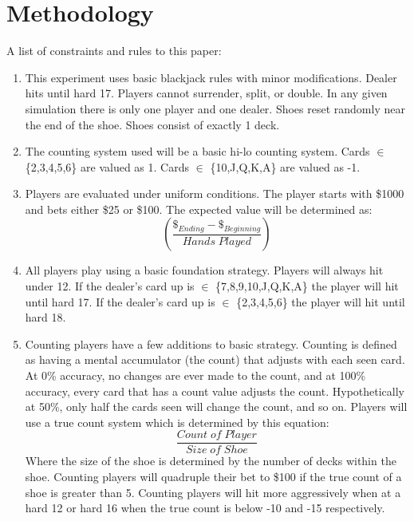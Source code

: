 \documentclass[11pt,letterpaper]{article}
\begin{document}
\part{Methodology}
A list of constraints and rules to this paper:
\begin{enumerate}
\item This experiment uses basic blackjack rules with minor modifications.
\subitem Dealer hits until hard 17.
\subitem Players cannot surrender, split, or double.
\subitem In any given simulation there is only one player and one dealer.
\subitem Shoes reset randomly near the end of the shoe.
\subitem Shoes consist of exactly 1 deck.
\item The counting system used will be a basic hi-lo counting system.
\subitem Cards $\in$ \{2,3,4,5,6\} are valued as 1.
\subitem Cards $\in$ \{10,J,Q,K,A\} are valued as -1.
\item Players are evaluated under uniform conditions.
\subitem The player starts with \$1000 and bets either \$25 or \$100.
\subitem The expected value will be determined as:
\[(\frac{\$_{Ending}-\$_{Beginning}}{Hands\;Played})\]
\item All players play using a basic foundation strategy.
\subitem Players will always hit under 12.
\subitem If the dealer's card up is $\in$ \{7,8,9,10,J,Q,K,A\} the player will hit until hard 17.
\subitem If the dealer's card up is $\in$ \{2,3,4,5,6\} the player will hit until hard 18.
\item Counting players have a few additions to basic strategy.
\subitem Counting is defined as having a mental accumulator (the count) that adjusts with each seen card. At 0\% accuracy, no changes are ever made to the count, and at 100\% accuracy, every card that has a count value adjusts the count. Hypothetically at 50\%, only half the cards seen will change the count, and so on.
\subitem Players will use a true count system which is determined by this equation:
\[\frac{Count\;of\;Player}{Size\;of\;Shoe}\]
Where the size of the shoe is determined by the number of decks within the shoe.
\subitem Counting players will quadruple their bet to \$100 if the true count of a shoe is greater than 5.
\subitem Counting players will hit more aggressively when at a hard 12 or hard 16 when the true count is below -10 and -15 respectively.

\end{enumerate}
\end{document}
